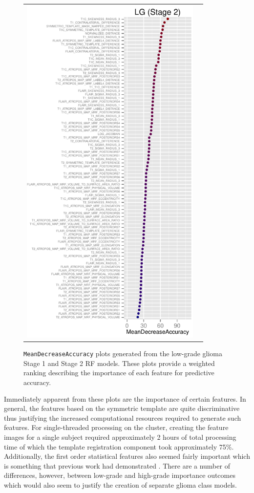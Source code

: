 \documentclass[preprint,authoryear,review,12pt]{elsarticle}
\begin{document}
\begin{figure}
{\begin{tabular}{cc}
  \includegraphics[width=90mm]{BRATS_LG_MAP_MRF.pdf} \\
  \end{tabular}
  }
  \caption{{\tt MeanDecreaseAccuracy} plots generated from the low-grade glioma
  Stage 1 and Stage 2 RF models.  These plots provide a weighted 
  ranking describing the importance of each feature for predictive accuracy.
  }
  \label{fig:lgimportance}
\end{figure}

Immediately apparent from these plots are the importance of certain features.
In general, the features based on the symmetric template are quite
discriminative thus justifying the increased computational 
resources required to generate such features.  For single-threaded processing
on the cluster, creating the feature images for a single subject required 
approximately 2 hours of total processing time of which the template registration 
component took approximately 75\%.  Additionally, the first order 
statistical features also seemed fairly important which is something that
previous work had demonstrated \citep[e.g.,][]{bauer2012,zikic2012}.
There are a number of differences, however, between low-grade and high-grade 
importance outcomes which would also seem to justify the creation of separate
glioma class models.
\end{document}
